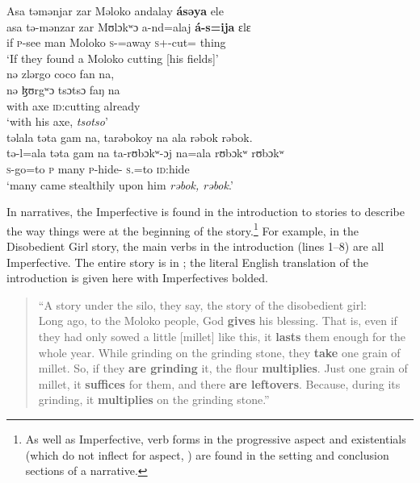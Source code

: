 \ea\label{ex:7:61}
Asa  təmənjar  zar  Məloko  andalay  \textbf{ásəya}  ele  \\
\gll  asa  tə-mənzar    zar  Mʊlɔkʷɔ a-nd=alaj \textbf{á{}-s=ija} ɛlɛ \\
      if  \textsc{p}-see man Moloko  \textsc{s}-{\PRG}=away    \textsc{s}+{\IFV}-cut={\PLU}  thing  \\
 \glt ‘If they found a Moloko cutting [his fields]’\\     
 
      \medskip
nə zlərgo coco  fan  na, \\      
\gll  nə ɮʊrgʷɔ tsɔtsɔ faŋ na \\    
      with    axe  \textsc{id}:cutting    already   {\PSP}\\
\glt ‘with his axe, \textit{tsotso}’\\

\medskip
təlala  təta  gam  na,  tarəbokoy  na  ala rəbok rəbok.\\
\gll tə-l=ala təta gam na ta-rʊbɔkʷ{}-ɔj na=ala {rʊbɔkʷ rʊbɔkʷ}\\
     \textsc{s}-go=to  \textsc{p}  many  {\PSP}  \textsc{p}-hide-{\CL}     \textsc{s}.{\DO}=to    {\textsc{id}:hide}\\
\glt  ‘many came stealthily upon him \textit{rəbok, rəbok}.’ 
\z 

In narratives, the Imperfective is found in the introduction to stories to describe the way things were at the beginning of the story.\footnote{As well as Imperfective, verb forms in the progressive aspect  and existentials (which do not inflect for aspect, ) are found in the setting and conclusion sections of a narrative.} For example, in the Disobedient Girl story, the main verbs in the introduction (lines 1--8) are all Imperfective. The entire story is in ; the literal English translation of the introduction is given here with Imperfectives bolded. 

\begin{quote}{“A story under the silo, they say, the story of the disobedient girl: \\ Long ago, to the Moloko people, God \textbf{gives} his blessing. That is, even if they had only sowed a little [millet] like this, it \textbf{lasts} them enough for the whole year. While grinding on the grinding stone, they \textbf{take} one grain of millet. So, if they \textbf{are grinding} it, the flour \textbf{multiplies}. Just one grain of millet, it \textbf{suffices} for them, and there \textbf{are leftovers}. Because, during its grinding, it \textbf{multiplies} on the grinding stone.”}\end{quote}

